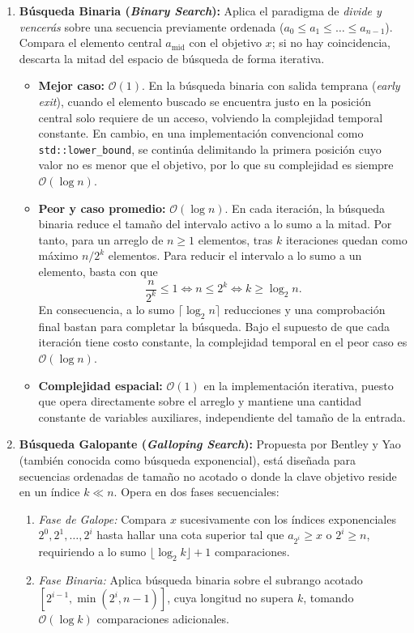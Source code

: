 \documentclass[11pt,letterpaper]{article}
\begin{document}
\begin{enumerate}
    
    \item \textbf{Búsqueda Binaria (\textit{Binary Search}):}
    Aplica el paradigma de \textit{divide y vencerás} sobre una secuencia previamente ordenada ($a_0 \le a_1 \le \dots \le a_{n-1}$). Compara el elemento central $a_{\text{mid}}$ con el objetivo $x$; si no hay coincidencia, descarta la mitad del espacio de búsqueda de forma iterativa.
    \begin{itemize}
        \item \textbf{Mejor caso:} $\mathcal{O}(1)$. En la búsqueda binaria con salida temprana (\textit{early exit}), cuando el elemento buscado se encuentra justo en la posición central solo requiere de un acceso, volviendo la complejidad temporal constante. En cambio, en una implementación convencional como \texttt{std::lower\_bound}, se continúa delimitando la primera posición cuyo valor no es menor que el objetivo, por lo que su complejidad es siempre $\mathcal{O}(\log n)$.
        \item \textbf{Peor y caso promedio:} $\mathcal{O}(\log n)$. En cada iteración, la búsqueda binaria reduce el tamaño del intervalo
        activo a lo sumo a la mitad. Por tanto, para un arreglo de $n \geq 1$
        elementos, tras $k$ iteraciones quedan como máximo $n/2^k$ elementos.
        Para reducir el intervalo a lo sumo a un elemento, basta con que
        \[
            \frac{n}{2^k} \leq 1
            \iff n \leq 2^k
            \iff k \geq \log_2 n.
        \]
        En consecuencia, a lo sumo $\lceil \log_2 n \rceil$ reducciones y una
        comprobación final bastan para completar la búsqueda. Bajo el supuesto
        de que cada iteración tiene costo constante, la complejidad temporal
        en el peor caso es $\mathcal{O}(\log n)$.
        \item \textbf{Complejidad espacial:} $\mathcal{O}(1)$ en la implementación iterativa, puesto que opera directamente sobre el arreglo y mantiene una cantidad constante de variables auxiliares, independiente del tamaño de la entrada.
    \end{itemize}

    \item \textbf{Búsqueda Galopante (\textit{Galloping Search}):}
    Propuesta por Bentley y Yao (también conocida como búsqueda exponencial), está diseñada para secuencias ordenadas de tamaño no acotado o donde la clave objetivo reside en un índice $k \ll n$. Opera en dos fases secuenciales:
    \begin{enumerate}
        \item \textit{Fase de Galope:} Compara $x$ sucesivamente con los índices exponenciales $2^0, 2^1, \dots, 2^i$ hasta hallar una cota superior tal que $a_{2^i} \ge x$ o $2^i \ge n$, requiriendo a lo sumo $\lfloor \log_2 k \rfloor + 1$ comparaciones.
        \item \textit{Fase Binaria:} Aplica búsqueda binaria sobre el subrango acotado $[2^{i-1}, \min(2^i, n-1)]$, cuya longitud no supera $k$, tomando $\mathcal{O}(\log k)$ comparaciones adicionales.


\end{enumerate}
\end{enumerate}
\end{document}
